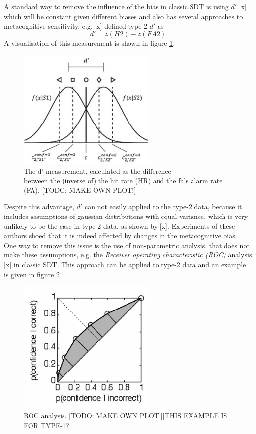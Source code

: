 \documentclass[../main/main.tex]{subfiles}
\begin{document}
	A standard way to remove the influence of the bias in classic SDT is using $d'$ [x] which will be constant given different biases and also has several approaches to metacognitive sensitivity, e.g. [x] defined type-2 $d'$ as
	\begin{displaymath}
		d' = z(H2) - z(FA2)
	\end{displaymath}
	A visualisation of this measurement is shown in figure \ref{fig:d_dash}.
	\begin{figure}[h]
		\centering
		\captionsetup{justification=centering}
		\label{fig:d_dash}
		\includegraphics[width=0.6\textwidth]{../assets/d_dash.png}
		\caption{The d' measurement, calculated as the difference\\ between the (inverse of) the hit rate (HR) and the fals alarm rate (FA). [TODO: MAKE OWN PLOT!]} 
	\end{figure}
	Despite this advantage, $d'$ can not easily applied to the type-2 data, because it includes assumptions of gaussian distributions with equal variance, which is very unlikely to be the case in type-2 data, as shown by [x]. Experiments of these authors shoed that it is indeed affected by changes in the metacognitive bias.\\
	One way to remove this issue is the use of non-parametric analysis, that does not make these assumptions, e.g. the \textit{Receiver operating characteristic (ROC)} analysis [x] in classic SDT. This approach can be applied to type-2 data and an example is given in figure \ref{fig:roc}\\
	\begin{figure}[h]
		\centering
		\captionsetup{justification=centering}
		\label{fig:roc}
		\includegraphics[width=0.6\textwidth]{../assets/type1_roc.png}
		\caption{ROC analysis. [TODO: MAKE OWN PLOT!][THIS EXAMPLE IS FOR TYPE-1?]} 
	\end{figure}
\end{document}
